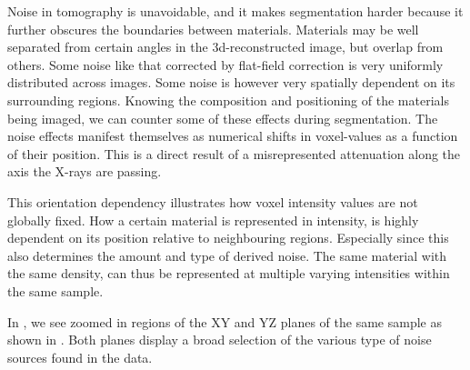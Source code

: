 Noise in tomography is unavoidable, and it makes segmentation harder because it further obscures
the boundaries between materials. Materials may be well separated from certain angles in the
3d-reconstructed image, but overlap from others. Some noise like that corrected by flat-field
correction is very uniformly distributed across images. Some noise is however very spatially
dependent on its surrounding regions. Knowing the composition and positioning of the materials
being imaged, we can counter some of these effects during segmentation. The noise effects manifest
themselves as numerical shifts in voxel-values as a function of their position. This is a direct
result of a misrepresented attenuation along the axis the X-rays are passing.

This orientation dependency illustrates how voxel intensity values are not globally fixed. How a
certain material is represented in intensity, is highly dependent on its position relative to
neighbouring regions. Especially since this also determines the amount and type of derived noise.
The same material with the same density, can thus be represented at multiple varying intensities
within the same sample.


In , we see zoomed in regions of the XY and YZ planes
of the same sample as shown in .
Both planes display a broad selection of the various type of noise sources found in the data.

